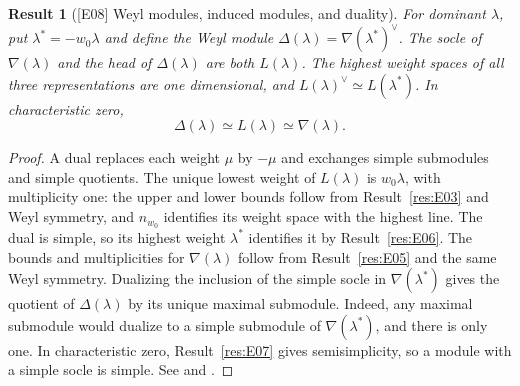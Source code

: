 \documentclass[11pt,a4paper,openany,oneside]{book}
\theoremstyle{resultstyle}
\newtheorem{statement}{Result}[chapter]
\newenvironment{result}[2]{\clubpenalty=10000\begin{statement}[\textnormal{[#1]} #2]\leavevmode\label{res:#1}\ignorespaces}{\end{statement}}
\theoremstyle{definition}
\numberwithin{equation}{chapter}
\begin{document}
\begin{result}{E08}{Weyl modules, induced modules, and duality}
For dominant \(\lambda\), put \(\lambda^*=-w_0\lambda\) and define the Weyl module \(\Delta(\lambda)=\nabla(\lambda^*)^\vee\). The socle of \(\nabla(\lambda)\) and the head of \(\Delta(\lambda)\) are both \(L(\lambda)\). The highest weight spaces of all three representations are one dimensional, and \(L(\lambda)^\vee\simeq L(\lambda^*)\). In characteristic zero,
\[
 \Delta(\lambda)\simeq L(\lambda)\simeq \nabla(\lambda).
\]
\end{result}
\begin{proof}
A dual replaces each weight \(\mu\) by \(-\mu\) and exchanges simple submodules and simple quotients. The unique lowest weight of \(L(\lambda)\) is \(w_0\lambda\), with multiplicity one: the upper and lower bounds follow from Result~\ref{res:E03} and Weyl symmetry, and \(n_{w_0}\) identifies its weight space with the highest line. The dual is simple, so its highest weight \(\lambda^*\) identifies it by Result~\ref{res:E06}. The bounds and multiplicities for \(\nabla(\lambda)\) follow from Result~\ref{res:E05} and the same Weyl symmetry. Dualizing the inclusion of the simple socle in \(\nabla(\lambda^*)\) gives the quotient of \(\Delta(\lambda)\) by its unique maximal submodule. Indeed, any maximal submodule would dualize to a simple submodule of \(\nabla(\lambda^*)\), and there is only one. In characteristic zero, Result~\ref{res:E07} gives semisimplicity, so a module with a simple socle is simple. See \cite[22.27--22.31]{milne} and \cite[Part~II, Sections~2.6 and~2.13]{jantzen}.
\end{proof}
\end{document}
